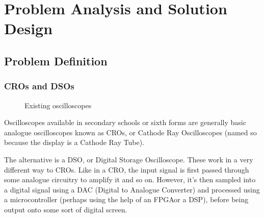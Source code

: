 \chapter{Problem Analysis and Solution Design}
\section{Problem Definition}
\subsection*{CROs and DSOs}

\begin{figure}[h]
  \centering
  \hfill
  \caption[Existing oscilloscopes]{Existing oscilloscopes\autocite{CROPhoto,DSOPhoto}}
\end{figure}

Oscilloscopes available in secondary schools or sixth forms are generally basic
analogue oscilloscopes known as CROs, or Cathode Ray Oscilloscopes (named so
because the display is a Cathode Ray Tube).~\autocite{DoctronicsScopes}

The alternative is a DSO, or Digital Storage Oscilloscope. These work in a very
different way to CROs. Like in a CRO, the input signal is first passed through
some analogue circuitry to amplify it and so on. However, it's then sampled
into a digital signal using a DAC (Digital to Analogue Converter) and processed
using a microcontroller (perhaps using the help of an FPGA\fdeffpga or a
DSP), before
being output onto some sort of digital screen.~\autocite{TiePieScopes}

